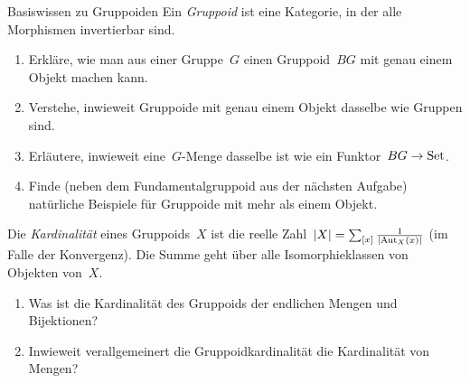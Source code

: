 \documentclass{uebblatt}
\begin{document}

\begin{aufgabe}{Basiswissen zu Gruppoiden}
Ein \emph{Gruppoid} ist eine Kategorie, in der alle Morphismen invertierbar
sind.
\begin{enumerate}
\item Erkläre, wie man aus einer Gruppe~$G$ einen Gruppoid~$BG$ mit genau einem Objekt
machen kann.
\item Verstehe, inwieweit Gruppoide mit genau einem Objekt dasselbe wie Gruppen
sind.
\item Erläutere, inwieweit eine~$G$-Menge dasselbe ist wie ein Funktor~$BG \to
\mathrm{Set}$.
\item Finde (neben dem Fundamentalgruppoid aus der nächsten Aufgabe) natürliche
Beispiele für Gruppoide mit mehr als einem Objekt.
\end{enumerate}
Die \emph{Kardinalität} eines Gruppoids~$X$ ist die reelle Zahl~$|X| =
\sum_{[x]} \frac{1}{|\mathrm{Aut}_X(x)|}$ (im Falle der Konvergenz). Die Summe geht
über alle Isomorphieklassen von Objekten von~$X$.
\begin{enumerate}
\addtocounter{enumi}{4}
\item Was ist die Kardinalität des Gruppoids der endlichen Mengen und
Bijektionen?
\item Inwieweit verallgemeinert die Gruppoidkardinalität die Kardinalität von
Mengen?
\end{enumerate}
\end{aufgabe}
\end{document}
